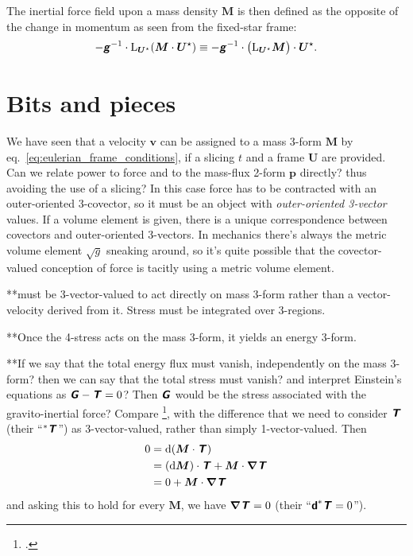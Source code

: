 \documentclass[\ifafour a4paper,12pt,\else a5paper,10pt,\fi%
onecolumn,oneside,article,%
british%
]{memoir}
\theoremstyle{remark}
\theoremstyle{innote}
\newcommand*{\mathte}[1]{\textbf{\textit{\textsf{#1}}}}
\newcommand*{\citep}{\footcites}%
\newcommand*{\di}{\mathrm{d}}%
\renewcommand*{\|}{\nonscript\,\vert\nonscript\;\mathopen{}}
\newcommand*{\chap}{ch.}%
\newcommand*{\eqn}{eq.}%
\newcommand*{\Li}{\mathrm{L}}
\newcommand*{\yrr}{M}
\newcommand*{\yr}{\bm{\yrr}}
\newcommand*{\yjj}{p}
\newcommand*{\yj}{\bm{\yjj}}
\newcommand*{\yGG}{G}
\newcommand*{\yG}{\mathte{\yGG}}
\newcommand*{\yTTf}{T}
\newcommand*{\yTf}{\mathte{\yTTf}}
\newcommand*{\yvvt}{v}
\newcommand*{\yvt}{\bm{\yvvt}}
\newcommand*{\yFF}{U}
\newcommand*{\yF}{\bm{\yFF}}
\newcommand*{\yFi}{\yF^{\mathord{\star}}}
\newcommand*{\ygg}{g}
\newcommand*{\yg}{\mathte{\ygg}}
\newcommand*{\ygv}{\sqrt{\ygg}}
\newcommand*{\yDi}{\bm{\nabla}}
\begin{document}
The inertial force field upon a mass density $\yr$ is then defined as the
opposite of the change in momentum as seen from the fixed-star frame:
\begin{equation}
  \label{eq:inertial_force_fixed-stars}
  -\yg^{-1} \cdot \Li_{\yFi}(\yr\cdot\yFi) \equiv
  -\yg^{-1} \cdot \bigl(\Li_{\yFi}\yr\bigr)\cdot\yFi.
\end{equation}

\section{Bits and pieces}
\label{sec:bits}




We have seen that a velocity $\yvt$ can be
assigned to a mass 3-form $\yr$ by
\eqn~\eqref{eq:eulerian_frame_conditions}, if a slicing $t$ and a frame
$\yF$ are provided. Can we relate power to force and to the mass-flux
2-form $\yj$ directly? thus avoiding the use of a slicing? In this case
force has to be contracted with an outer-oriented 3-covector, so it must be
an object with \emph{outer-oriented 3-vector} values. If a volume element
is given, there is a unique correspondence between covectors and
outer-oriented 3-vectors. In mechanics there's always the metric volume
element $\ygv$ sneaking around, so it's quite possible that the
covector-valued conception of force is tacitly using a metric volume
element.


**must be 3-vector-valued to act directly on mass 3-form rather than a
vector-velocity derived from it. Stress must be integrated over 3-regions.

**Once the 4-stress acts on the mass 3-form, it yields an energy 3-form.

**If we say that the total energy flux must vanish, independently on the
mass 3-form? then we can say that the total stress must vanish? and
interpret Einstein's equations as $\yG-\yTf = 0$? Then $\yG$ would be the
stress associated with the gravito-inertial force? Compare
\citep[\chap~15]{misneretal1970_r1973}, with the difference that we need to
consider $\yTf$ (their \enquote{$^*\yTf$}) as
3-vector-valued, rather than simply 1-vector-valued. Then
\begin{equation}
  \label{eq:why_4stress_zero}
  \begin{split}
    0 &=   \di(\yr \cdot \yTf) \\
    &= (\di\yr)\cdot\yTf + \yr \cdot \yDi\yTf \\
    &= 0 + \yr \cdot \yDi\yTf
  \end{split}
\end{equation}
and asking this to hold for every $\yr$, we have $\yDi\yTf = 0$ (their
\enquote{$\bm{\mathsf{d}}^*\yTf=0$}).
\end{document}
